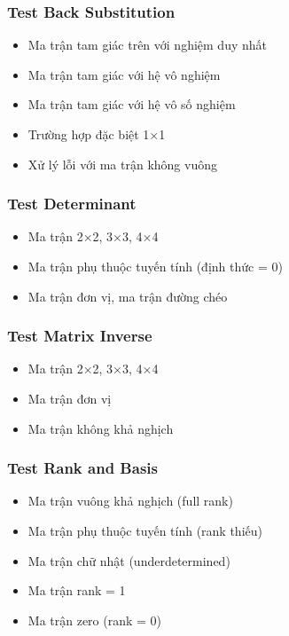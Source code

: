 \documentclass[12pt, a4paper, twoside]{article}
\begin{document}
\subsubsection{Test Back Substitution}

\begin{itemize}
    \item Ma trận tam giác trên với nghiệm duy nhất
    \item Ma trận tam giác với hệ vô nghiệm
    \item Ma trận tam giác với hệ vô số nghiệm
    \item Trường hợp đặc biệt 1×1
    \item Xử lý lỗi với ma trận không vuông
\end{itemize}

\subsubsection{Test Determinant}

\begin{itemize}
    \item Ma trận 2×2, 3×3, 4×4
    \item Ma trận phụ thuộc tuyến tính (định thức = 0)
    \item Ma trận đơn vị, ma trận đường chéo
\end{itemize}

\subsubsection{Test Matrix Inverse}

\begin{itemize}
    \item Ma trận 2×2, 3×3, 4×4
    \item Ma trận đơn vị
    \item Ma trận không khả nghịch
\end{itemize}

\subsubsection{Test Rank and Basis}

\begin{itemize}
    \item Ma trận vuông khả nghịch (full rank)
    \item Ma trận phụ thuộc tuyến tính (rank thiếu)
    \item Ma trận chữ nhật (underdetermined)
    \item Ma trận rank = 1
    \item Ma trận zero (rank = 0)
\end{itemize}
\end{document}
